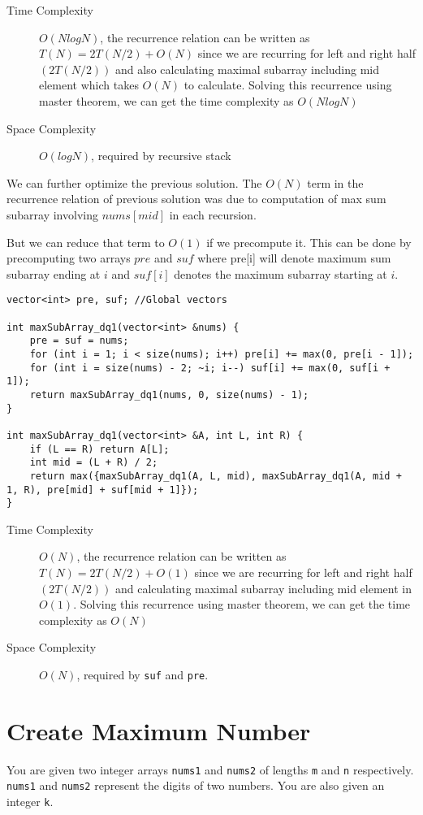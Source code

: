 \documentclass[11pt]{article}
\begin{document}
\begin{description}
\item[{Time Complexity}] \(O(NlogN)\), the recurrence relation can be written as \(T(N) = 2T(N/2) + O(N)\) since we are recurring for left and right half \((2T(N/2))\) and also calculating maximal subarray including mid element which takes \(O(N)\) to calculate. Solving this recurrence using master theorem, we can get the time complexity as \(O(NlogN)\)
\item[{Space Complexity}] \(O(logN)\), required by recursive stack
\end{description}

We can further optimize the previous solution. The \(O(N)\) term in the recurrence relation of previous solution was due to computation of max sum subarray involving \(nums[mid]\) in each recursion.

But we can reduce that term to \(O(1)\) if we precompute it. This can be done by precomputing two arrays \(pre\) and \(suf\) where pre[i] will denote maximum sum subarray ending at \(i\) and \(suf[i]\) denotes the maximum subarray starting at \(i\).

\begin{verbatim}
vector<int> pre, suf; //Global vectors

int maxSubArray_dq1(vector<int> &nums) {
    pre = suf = nums;
    for (int i = 1; i < size(nums); i++) pre[i] += max(0, pre[i - 1]);
    for (int i = size(nums) - 2; ~i; i--) suf[i] += max(0, suf[i + 1]);
    return maxSubArray_dq1(nums, 0, size(nums) - 1);
}

int maxSubArray_dq1(vector<int> &A, int L, int R) {
    if (L == R) return A[L];
    int mid = (L + R) / 2;
    return max({maxSubArray_dq1(A, L, mid), maxSubArray_dq1(A, mid + 1, R), pre[mid] + suf[mid + 1]});
}
\end{verbatim}

\begin{description}
\item[{Time Complexity}] \(O(N)\), the recurrence relation can be written as \(T(N) = 2T(N/2) + O(1)\) since we are recurring for left and right half \((2T(N/2))\) and calculating maximal subarray including mid element in \(O(1)\). Solving this recurrence using master theorem, we can get the time complexity as \(O(N)\)
\item[{Space Complexity}] \(O(N)\), required by \texttt{suf} and \texttt{pre}.
\end{description}

\section{Create Maximum Number}
\label{sec:orgd19bb53}
You are given two integer arrays \texttt{nums1} and \texttt{nums2} of lengths \texttt{m} and \texttt{n} respectively. \texttt{nums1} and \texttt{nums2} represent the digits of two numbers. You are also given an integer \texttt{k}.
\end{document}
